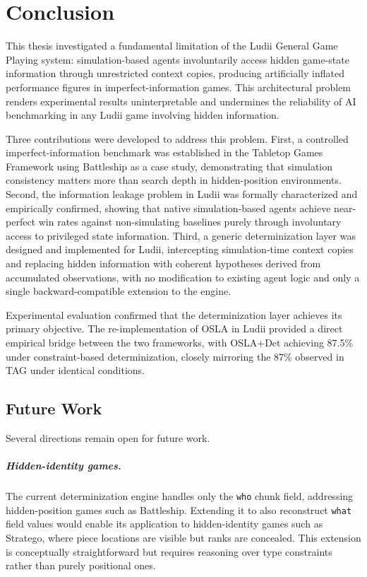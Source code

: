 \chapter{Conclusion}
\label{conclusion}

This thesis investigated a fundamental limitation of the Ludii General Game 
Playing system: simulation-based agents involuntarily access hidden game-state 
information through unrestricted context copies, producing artificially 
inflated performance figures in imperfect-information games. This architectural 
problem renders experimental results uninterpretable and undermines the 
reliability of AI benchmarking in any Ludii game involving hidden information.

Three contributions were developed to address this problem. First, a controlled 
imperfect-information benchmark was established in the Tabletop Games Framework 
using Battleship as a case study, demonstrating that simulation consistency 
matters more than search depth in hidden-position environments. Second, the 
information leakage problem in Ludii was formally characterized and empirically 
confirmed, showing that native simulation-based agents achieve near-perfect win 
rates against non-simulating baselines purely through involuntary access to 
privileged state information. Third, a generic determinization layer was 
designed and implemented for Ludii, intercepting simulation-time context copies 
and replacing hidden information with coherent hypotheses derived from 
accumulated observations, with no modification to existing agent logic and only 
a single backward-compatible extension to the engine.

Experimental evaluation confirmed that the determinization layer achieves its 
primary objective. The re-implementation of OSLA in Ludii provided a direct 
empirical bridge between the two frameworks, with OSLA+Det achieving 87.5\% 
under constraint-based determinization, closely mirroring the 87\% observed 
in TAG under identical conditions.

\newpage

\section*{Future Work}

Several directions remain open for future work.

\paragraph{Hidden-identity games.}
The current determinization engine handles only the \texttt{who} chunk field, 
addressing hidden-position games such as Battleship. Extending it to also 
reconstruct \texttt{what} field values would enable its application to 
hidden-identity games such as Stratego, where piece locations are visible but 
ranks are concealed. This extension is conceptually straightforward but 
requires reasoning over type constraints rather than purely positional ones.

